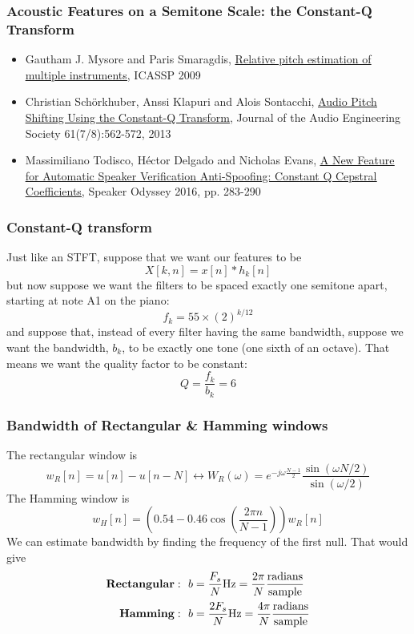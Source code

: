 \documentclass{beamer}
\begin{document}
\begin{frame}
  \frametitle{Acoustic Features  on a Semitone Scale: the Constant-Q Transform}

  \begin{itemize}
  \item Gautham J. Mysore and Paris Smaragdis,
    \href{https://ieeexplore.ieee.org/document/4959583}{\underline{Relative pitch estimation of multiple instruments}}, ICASSP 2009
  \item Christian Sch\"{o}rkhuber, Anssi Klapuri and Alois Sontacchi,
    \href{https://www.cs.tut.fi/sgn/arg/klap/schoerkhuber-JAES-2013.pdf}{\underline{Audio Pitch Shifting Using the Constant-Q Transform}}, Journal of the Audio Engineering Society 61(7/8):562-572, 2013
  \item Massimiliano Todisco, H\'{e}ctor Delgado and Nicholas Evans,
    \href{https://pdfs.semanticscholar.org/1c8b/4e300f86555b514ec1e0c3fd58763524c2ac.pdf}{\underline{A New Feature for Automatic Speaker Verification} \underline{Anti-Spoofing: Constant Q Cepstral Coefficients}}, Speaker Odyssey 2016, pp. 283-290
  \end{itemize}
\end{frame}

\begin{frame}
  \frametitle{Constant-Q transform}

  Just like an STFT, suppose that we want our features to be
  \[
  X[k,n] = x[n]\ast h_k[n]
  \]
  but now suppose we want the filters to be spaced exactly one
  semitone apart, starting at note A1 on the piano:
  \[
  f_k = 55\times (2)^{k/12}
  \]
  and suppose that, instead of every filter having the same bandwidth,
  suppose we want the bandwidth, $b_k$, to be exactly one tone (one
  sixth of an octave).  That means we want the quality factor to be
  constant:
  \[
  Q = \frac{f_k}{b_k} = 6
  \]
\end{frame}
  
\begin{frame}
  \frametitle{Bandwidth of Rectangular \& Hamming windows}
  
  The rectangular window is
  \[
  w_R[n]=u[n]-u[n-N] \leftrightarrow
  W_R(\omega)=e^{-j\omega\frac{N-1}{2}}\frac{\sin(\omega N/2)}{\sin(\omega/2)}
  \]
  The Hamming window is
  \[
  w_H[n] = \left(0.54-0.46\cos\left(\frac{2\pi n}{N-1}\right)\right)w_R[n]
  \]
  We can estimate bandwidth by finding the frequency of the first null.  That would give
  \begin{align*}
    {\bf Rectangular}: &~~b =\frac{F_s}{N}\mbox{Hz} =\frac{2\pi}{N}\frac{\mbox{radians}}{\mbox{sample}}\\
    {\bf Hamming}: &~~b =\frac{2F_s}{N}\mbox{Hz} =\frac{4\pi}{N}\frac{\mbox{radians}}{\mbox{sample}}
  \end{align*}
\end{frame}
\end{document}
